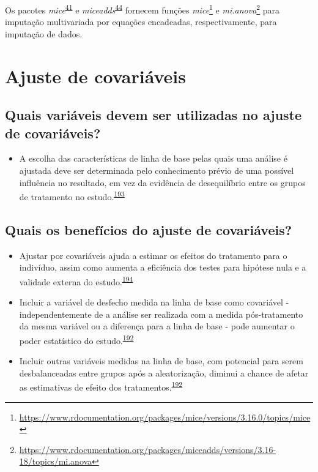 \documentclass[
  a4paper,
]{book}
\providecommand{\tightlist}{%
  \setlength{\itemsep}{0pt}\setlength{\parskip}{0pt}}
\renewcommand{\href}[2]{#2\footnote{\url{#1}}}
\newenvironment{infobox}[1]
  {
  \begin{itemize}
  \renewcommand{\labelitemi}{
    \raisebox{-.7\height}[0pt][0pt]{
      {\setkeys{Gin}{width=3em,keepaspectratio}
        \texttt{[image: \#1]}}
    }
  }
  \setlength{\fboxsep}{1em}
  \begin{blackbox}
  \item
  }
  {
  \end{blackbox}
  \end{itemize}
  }
\begin{document}
\begin{infobox}{images/Rlogo}
Os pacotes \emph{mice}\textsuperscript{\protect\hyperlink{ref-mice}{41}} e \emph{miceadds}\textsuperscript{\protect\hyperlink{ref-miceadds}{44}} fornecem funções \href{https://www.rdocumentation.org/packages/mice/versions/3.16.0/topics/mice}{\emph{mice}} e \href{https://www.rdocumentation.org/packages/miceadds/versions/3.16-18/topics/mi.anova}{\emph{mi.anova}} para imputação multivariada por equações encadeadas, respectivamente, para imputação de dados.

\end{infobox}

\hypertarget{ajuste-de-covariaveis}{%
\section{Ajuste de covariáveis}\label{ajuste-de-covariaveis}}

\hypertarget{quais-variuxe1veis-devem-ser-utilizadas-no-ajuste-de-covariuxe1veis}{%
\subsection{Quais variáveis devem ser utilizadas no ajuste de covariáveis?}\label{quais-variuxe1veis-devem-ser-utilizadas-no-ajuste-de-covariuxe1veis}}

\begin{itemize}
\tightlist
\item
  A escolha das características de linha de base pelas quais uma análise é ajustada deve ser determinada pelo conhecimento prévio de uma possível influência no resultado, em vez da evidência de desequilíbrio entre os grupos de tratamento no estudo.\textsuperscript{\protect\hyperlink{ref-roberts1999}{193}}
\end{itemize}

\hypertarget{quais-os-benefuxedcios-do-ajuste-de-covariuxe1veis}{%
\subsection{Quais os benefícios do ajuste de covariáveis?}\label{quais-os-benefuxedcios-do-ajuste-de-covariuxe1veis}}

\begin{itemize}
\item
  Ajustar por covariáveis ajuda a estimar os efeitos do tratamento para o indivíduo, assim como aumenta a eficiência dos testes para hipótese nula e a validade externa do estudo.\textsuperscript{\protect\hyperlink{ref-Hauck1998}{194}}
\item
  Incluir a variável de desfecho medida na linha de base como covariável - independentemente de a análise ser realizada com a medida pós-tratamento da mesma variável ou a diferença para a linha de base - pode aumentar o poder estatístico do estudo.\textsuperscript{\protect\hyperlink{ref-Kahan2014}{192}}
\item
  Incluir outras variáveis medidas na linha de base, com potencial para serem desbalanceadas entre grupos após a aleatorização, diminui a chance de afetar as estimativas de efeito dos tratamentos.\textsuperscript{\protect\hyperlink{ref-Kahan2014}{192}}
\end{itemize}
\end{document}
